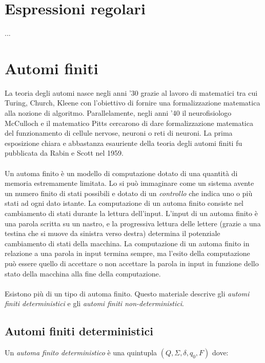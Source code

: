 \documentclass[]{article}
\begin{document}
\newpage
\section{Espressioni regolari}

...



\newpage
\section{Automi finiti}

La teoria degli automi nasce negli anni '30 grazie al lavoro di matematici tra cui Turing, Church, Kleene
con l'obiettivo di fornire una formalizzazione matematica alla nozione di algoritmo. Parallelamente, negli
anni '40 il neurofisiologo McCulloch e il matematico Pitts cercarono di dare formalizzazione matematica del
funzionamento di cellule nervose, neuroni o reti di neuroni. La prima esposizione chiara e abbastanza
esauriente della teoria degli automi finiti fu pubblicata da Rabin e Scott nel 1959.
\\
\\
Un automa finito è un modello di computazione dotato di una quantità di memoria estremamente limitata. Lo
si può immaginare come un sistema avente un numero finito di stati possibili e dotato di un \textit{controllo}
che indica uno o più stati ad ogni dato istante. La computazione di un automa finito consiste nel cambiamento
di stati durante la lettura dell'input. L'input di un automa finito è una parola scritta su un nastro, e la
progressiva lettura delle lettere (grazie a una testina che si muove da sinistra verso destra) determina il
potenziale cambiamento di stati della macchina. La computazione di un automa finito in relazione a una
parola in input termina sempre, ma l'esito della computazione può essere quello di accettare o non accettare
la parola in input in funzione dello stato della macchina alla fine della computazione.
\\
\\
Esistono più di un tipo di automa finito. Questo materiale descrive gli \textit{automi finiti deterministici}
e gli \textit{automi finiti non-deterministici}.


\subsection{Automi finiti deterministici}
Un \textit{automa finito deterministico} è una quintupla \mbox{$(Q, \Sigma, \delta, q_0, F)$} dove:
\end{document}
